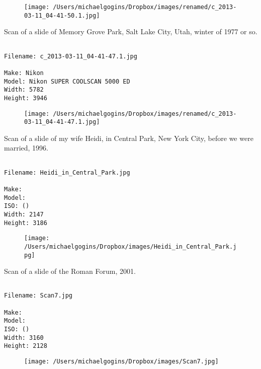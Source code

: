 \documentclass[11pt,letter,DIV=14,paper=landscape]{scrbook}
\begin{document}
\begin{figure}
\texttt{[image: /Users/michaelgogins/Dropbox/images/renamed/c\_2013-03-11\_04-41-50.1.jpg]}
\end{figure}
    
\clearpage
\noindent Scan of a slide of Memory Grove Park, Salt Lake City, Utah, winter of 1977 or so.
\noindent
\begin{lstlisting}

Filename: c_2013-03-11_04-41-47.1.jpg

Make: Nikon
Model: Nikon SUPER COOLSCAN 5000 ED
Width: 5782
Height: 3946
\end{lstlisting}
\clearpage

\begin{figure}
\texttt{[image: /Users/michaelgogins/Dropbox/images/renamed/c\_2013-03-11\_04-41-47.1.jpg]}
\end{figure}
    
\clearpage
\noindent Scan of a slide of my wife Heidi, in Central Park, New York City, before we were married, 1996.
\noindent
\begin{lstlisting}

Filename: Heidi_in_Central_Park.jpg

Make: 
Model: 
ISO: ()
Width: 2147
Height: 3186
\end{lstlisting}
\clearpage

\begin{figure}
\texttt{[image: /Users/michaelgogins/Dropbox/images/Heidi\_in\_Central\_Park.jpg]}
\end{figure}
    
\clearpage
\noindent Scan of a slide of the Roman Forum, 2001.
\noindent
\begin{lstlisting}

Filename: Scan7.jpg

Make: 
Model: 
ISO: ()
Width: 3160
Height: 2128
\end{lstlisting}
\clearpage

\begin{figure}
\texttt{[image: /Users/michaelgogins/Dropbox/images/Scan7.jpg]}
\end{figure}
    
\end{document}
